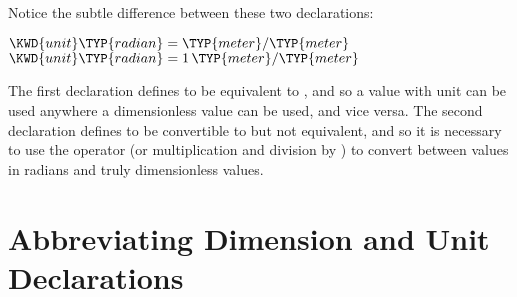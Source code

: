 Notice the subtle difference between these two declarations:
\begin{Fortress}
\(\KWD{unit} \TYP{radian} = \TYP{meter}/\TYP{meter}\)\\
\(\KWD{unit} \TYP{radian} = 1\,\TYP{meter}/\TYP{meter}\)
\end{Fortress}
The first declaration defines  to be equivalent to
, and so a value with unit  can be used
anywhere a dimensionless value can be used, and vice versa.
The second declaration defines  to be convertible to
 but not equivalent, and so it is necessary to use
the  operator (or multiplication and division by )
to convert between values in radians and truly dimensionless values.


\section{Abbreviating Dimension and Unit Declarations}

